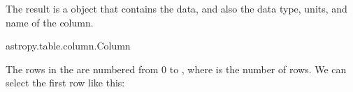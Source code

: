 \documentclass[letterpaper,10pt,english]{sphinxmanual}
\begin{document}
The result is a  object that contains the data, and also the data type, units, and name of the column.

\begin{sphinxVerbatim}[commandchars=\\\{\}]
\PYG{p}{[}\PYG{p}{]}
\end{sphinxVerbatim}

\begin{sphinxVerbatim}[commandchars=\\\{\}]
astropy.table.column.Column
\end{sphinxVerbatim}

The rows in the  are numbered from 0 to , where  is the number of rows.  We can select the first row like this:

\begin{sphinxVerbatim}[commandchars=\\\{\}]
\PYG{p}{[}\PYG{p}{]}
\end{sphinxVerbatim}
\end{document}
